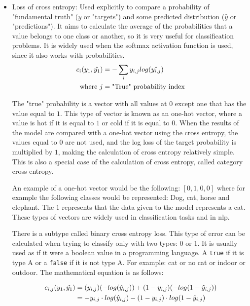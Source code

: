 \begin{itemize}
\item Loss of cross entropy: Used explicitly to compare a probability of "fundamental truth" ($y$ or "targets") and some predicted distribution ($\hat{y}$ or "predictions"). It aims to calculate the average of the probabilities that a value belongs to one class or another, so it is very useful for classification problems. It is widely used when the softmax activation function is used, since it also works with probabilities.
\begin{equation}
\centering
    \begin{split}
        c_i(y_1, \hat{y_1}) &= - \sum_i y_{i,j}log(\hat{y_{i,j}})\\
        \text{where}~j &= \text{"True" probability index}
    \end{split}
\end{equation}


The "true" probability is a vector with all values at $0$ except one that has the value equal to $1$. This type of vector is known as an one-hot vector, where a value is hot if it is equal to $1$ or cold if it is equal to $0$. When the results of the model are compared with a one-hot vector using the cross entropy, the values equal to $0$ are not used, and the log loss of the target probability is multiplied by $1$, making the calculation of cross entropy relatively simple. This is also a special case of the calculation of cross entropy, called category cross entropy.
\newline

An example of a one-hot vector would be the following: $[0,1,0,0]$ where for example the following classes would be represented: Dog, cat, horse and elephant. The $1$ represents that the data given to the model represents a cat. These types of vectors are widely used in classification tasks and in \acrfull{nlp}.
\newline

There is a subtype called binary cross entropy loss. This type of error can be calculated when trying to classify only with two types: $0$ or $1$. It is usually used as if it were a boolean value in a programming language. A \small{\verb|true|} \normalsize if it is type A or a \small{\verb|false|} \normalsize if it is not type A. For example: cat or no cat or indoor or outdoor. The mathematical equation is as follows:

\begin{equation}
\centering
    \begin{split}
        c_{i,j}(y_1, \hat{y_1}) &= (y_{i,j})(-log(\hat{y}_{i,j})) + (1-y_{i,j}) (-log(1 - \hat{y}_{i,j})) \\
        &= -y_{i,j} \cdot log(\hat{y}_{i,j}) - (1 - y_{i,j}) \cdot log(1 - \hat{y}_{i,j})
    \end{split}
\end{equation}


\end{itemize}

